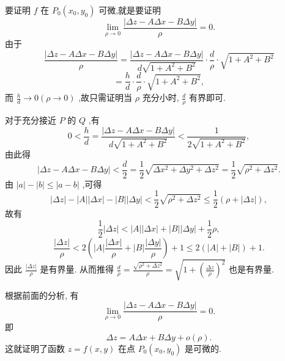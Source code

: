 要证明 \(f\) 在 \({P}_{0}\left( {{x}_{0},{y}_{0}}\right)\) 可微,就是要证明
\[
\mathop{\lim }\limits_{{\rho  \rightarrow  0}}\frac{\left| \Delta z - A\Delta x - B\Delta y\right| }{\rho } = 0.
\]
由于
\[
\frac{\left| \Delta z - A\Delta x - B\Delta y\right| }{\rho } = \frac{\left| \Delta z - A\Delta x - B\Delta y\right| }{d\sqrt{1 + {A}^{2} + {B}^{2}}} \cdot  \frac{d}{\rho } \cdot  \sqrt{1 + {A}^{2} + {B}^{2}}
\]
\[
= \frac{h}{d} \cdot  \frac{d}{\rho } \cdot  \sqrt{1 + {A}^{2} + {B}^{2}},
\]
而 \(\frac{h}{d} \rightarrow  0\left( {\rho  \rightarrow  0}\right)\) ,故只需证明当 \(\rho\) 充分小时, \(\frac{d}{\rho }\) 有界即可.

对于充分接近 \(P\) 的 \(Q\) ,有
\[
0 < \frac{h}{d} = \frac{\left| \Delta z - A\Delta x - B\Delta y\right| }{d\sqrt{1 + {A}^{2} + {B}^{2}}} < \frac{1}{2\sqrt{1 + {A}^{2} + {B}^{2}}},
\]
由此得
\[
\left| {{\Delta z} - {A\Delta x} - {B\Delta y}}\right|  < \frac{d}{2} = \frac{1}{2}\sqrt{\Delta {x}^{2} + \Delta {y}^{2} + \Delta {z}^{2}} = \frac{1}{2}\sqrt{{\rho }^{2} + \Delta {z}^{2}}.
\]
由 \(\left| a\right|  - \left| b\right|  \leq  \left| {a - b}\right|\) ,可得
\[
\left| {\Delta z}\right|  - \left| A\right| \left| {\Delta x}\right|  - \left| B\right| \left| {\Delta y}\right|  < \frac{1}{2}\sqrt{{\rho }^{2} + \Delta {z}^{2}} \leq  \frac{1}{2}\left( {\rho  + \left| {\Delta z}\right| }\right) ,
\]
故有
\[
\frac{1}{2}\left| {\Delta z}\right|  < \left| A\right| \left| {\Delta x}\right|  + \left| B\right| \left| {\Delta y}\right|  + \frac{1}{2}\rho ,
\]
\[
\frac{\left| \Delta z\right| }{\rho } < 2\left( {\left| A\right| \frac{\left| \Delta x\right| }{\rho } + \left| B\right| \frac{\left| \Delta y\right| }{\rho }}\right)  + 1 \leq  2\left( {\left| A\right|  + \left| B\right| }\right)  + 1.
\]
因此 \(\frac{\left| \Delta z\right| }{\rho }\) 是有界量. 从而推得 \(\frac{d}{\rho } = \frac{\sqrt{{\rho }^{2} + \Delta {z}^{2}}}{\rho } = \sqrt{1 + {\left( \frac{\Delta z}{\rho }\right) }^{2}}\) 也是有界量.

根据前面的分析, 有
\[
\mathop{\lim }\limits_{{\rho  \rightarrow  0}}\frac{\left| \Delta z - A\Delta x - B\Delta y\right| }{\rho } = 0.
\]
即
\[
{\Delta z} = {A\Delta x} + {B\Delta y} + o\left( \rho \right) .
\]
这就证明了函数 \(z = f\left( {x,y}\right)\) 在点 \({P}_{0}\left( {{x}_{0},{y}_{0}}\right)\) 是可微的.

